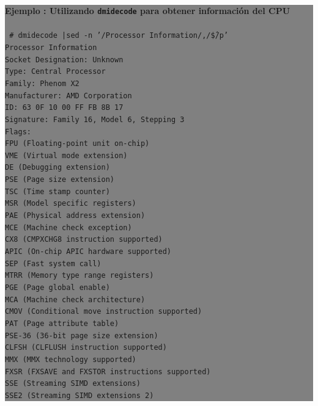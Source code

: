 \documentclass[12pt]{article}
\begin{document}
\colorbox{grey}{\parbox[t]{0.95\linewidth}{ \vspace*{0.5cm} { 
{\bf Ejemplo : Utilizando \texttt{dmidecode} para obtener información del CPU}
\\ \\
{\tt \scriptsize
\# dmidecode |sed -n '/Processor Information/,/\^\$/p'\\
Processor Information\\
	Socket Designation: Unknown\\
	Type: Central Processor\\
	Family: Phenom X2\\
	Manufacturer: AMD Corporation\\
	ID: 63 0F 10 00 FF FB 8B 17\\
	Signature: Family 16, Model 6, Stepping 3\\
	Flags:\\
		FPU (Floating-point unit on-chip)\\
		VME (Virtual mode extension)\\
		DE (Debugging extension)\\
		PSE (Page size extension)\\
		TSC (Time stamp counter)\\
		MSR (Model specific registers)\\
		PAE (Physical address extension)\\
		MCE (Machine check exception)\\
		CX8 (CMPXCHG8 instruction supported)\\
		APIC (On-chip APIC hardware supported)\\
		SEP (Fast system call)\\
		MTRR (Memory type range registers)\\
		PGE (Page global enable)\\
		MCA (Machine check architecture)\\
		CMOV (Conditional move instruction supported)\\
		PAT (Page attribute table)\\
		PSE-36 (36-bit page size extension)\\
		CLFSH (CLFLUSH instruction supported)\\
		MMX (MMX technology supported)\\
		FXSR (FXSAVE and FXSTOR instructions supported)\\
		SSE (Streaming SIMD extensions)\\
		SSE2 (Streaming SIMD extensions 2)\\
}}}}
\end{document}
